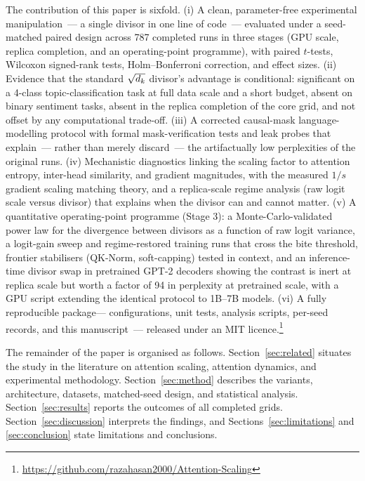 The contribution of this paper is sixfold. (i) A clean, parameter-free
experimental manipulation~--- a single divisor in one line of code~--- evaluated
under a seed-matched paired design across 787 completed runs in three stages
(GPU scale, replica completion, and an operating-point programme), with paired
$t$-tests, Wilcoxon signed-rank tests, Holm--Bonferroni
correction, and effect sizes. (ii) Evidence that the standard $\sqrt{d_k}$
divisor's advantage is conditional: significant on a 4-class
topic-classification task at full data scale and a short budget, absent on
binary sentiment tasks, absent in the replica completion of the core grid, and
not offset by any computational trade-off. (iii) A corrected causal-mask
language-modelling protocol with formal mask-verification tests and leak probes
that explain~--- rather than merely discard~--- the artifactually low
perplexities of the original runs. (iv) Mechanistic diagnostics linking the
scaling factor to attention entropy, inter-head similarity, and gradient
magnitudes, with the measured $1/s$ gradient scaling matching theory, and a
replica-scale regime analysis (raw logit scale versus divisor) that explains
when the divisor can and cannot matter. (v) A quantitative operating-point
programme (Stage 3): a Monte-Carlo-validated power law for the divergence
between divisors as a function of raw logit variance, a logit-gain sweep and
regime-restored training runs that cross the bite threshold, frontier
stabilisers (QK-Norm, soft-capping) tested in context, and an
inference-time divisor swap in pretrained GPT-2 decoders showing the contrast
is inert at replica scale but worth a factor of 94 in perplexity at pretrained
scale, with a GPU script extending the identical protocol to 1B--7B models.
(vi) A fully reproducible package---
configurations, unit tests, analysis scripts, per-seed records, and this
manuscript~--- released under an MIT licence.\footnote{\url{https://github.com/razahasan2000/Attention-Scaling}}

The remainder of the paper is organised as follows.
Section~\ref{sec:related} situates the study in the literature on attention
scaling, attention dynamics, and experimental methodology.
Section~\ref{sec:method} describes the variants, architecture, datasets,
matched-seed design, and statistical analysis.
Section~\ref{sec:results} reports the outcomes of all completed grids.
Section~\ref{sec:discussion} interprets the findings, and
Sections~\ref{sec:limitations} and \ref{sec:conclusion} state limitations and
conclusions.

